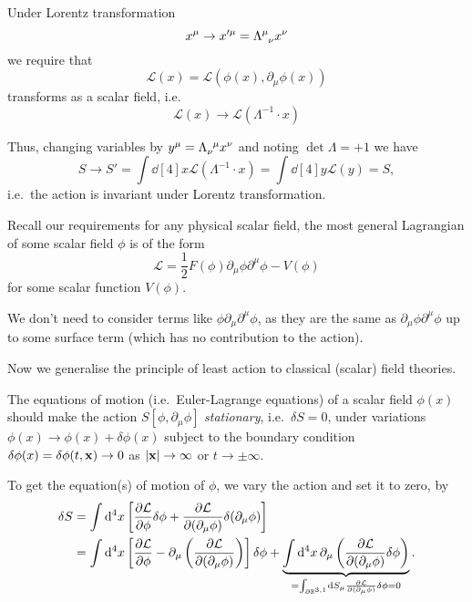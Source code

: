 \documentclass[a4paper,11pt]{article}
\begin{document}
	Under Lorentz transformation 
	\[
		x^\mu \to x'^\mu = \LT{\mu}{\nu} x^\nu
	\]
	we require that
	\[
		\mathcal{L}(x) = \mathcal{L}(\phi(x), \partial_\mu \phi(x))
	\]
	transforms as a scalar field, i.e.\ 
	\[
		\mathcal{L}(x) \to \mathcal{L}(\Lambda^{-1} \cdot x)
	\]
	
	Thus, changing variables by $y^\mu = \iLT{\nu}{\mu}x^\nu$ and noting $\det \Lambda = +1$ we have
	\[
		S \to S' = \int \dd[4]{x} \mathcal{L}(\Lambda^{-1} \cdot x) = \int \dd[4]{y} \mathcal{L}(y) = S,
	\]
	i.e.\ the action is invariant under Lorentz transformation.

	Recall our requirements for any physical scalar field, the most general Lagrangian of some scalar field $\phi$ is of the form
	\begin{equation}
		\mathcal{L} = \frac{1}{2} F(\phi) \partial_\mu \phi \partial^\mu \phi - V(\phi)
	\end{equation}
	for some scalar function $V(\phi)$.

	\begin{nt}
		We don't need to consider terms like $\phi \partial_\mu \partial^\mu \phi$, as they are the same as $\partial_\mu \phi \partial^\mu \phi$ up to some surface term (which has no contribution to the action).
	\end{nt}

	Now we generalise the principle of least action to classical (scalar) field theories.

	\begin{pos}
		The equations of motion (i.e.\ Euler-Lagrange equations) of a scalar field $\phi(x)$ should make the action $S[\phi,\partial_\mu \phi]$ \emph{stationary}, i.e.\ $\delta S = 0$, under variations $\phi(x) \to \phi(x) + \delta \phi(x)$ subject to the boundary condition $\delta \phi(x) = \delta \phi(t,\vb x) \to 0$ as $\abs{\vb x} \to \infty$ or $t \to \pm \infty$.
	\end{pos}

	To get the equation(s) of motion of $\phi$, we vary the action and set it to zero, by
	\begin{align*}
		\delta S & = \int \dd[4]{x} \left[ \pdv{\mathcal{L}}{\phi} \delta \phi + \pdv{\mathcal{L}}{(\partial_\mu \phi)}\delta (\partial_\mu \phi) \right]\\
		& = \int \dd[4]{x} \left[ \pdv{\mathcal{L}}{\phi} - \partial_\mu \left( \pdv{\mathcal{L}}{(\partial_\mu \phi)} \right) \right] \delta \phi + \underbrace{\int \dd[4]{x} \partial_\mu \left( \pdv{\mathcal{L}}{(\partial_\mu \phi)} \delta \phi \right)}_{ = \int_{\partial \mathbb{R}^{3,1}} \dd{S_\mu} \pdv{\mathcal{L}}{(\partial_\mu \phi)} \delta \phi = 0}.
	\end{align*}
\end{document}

